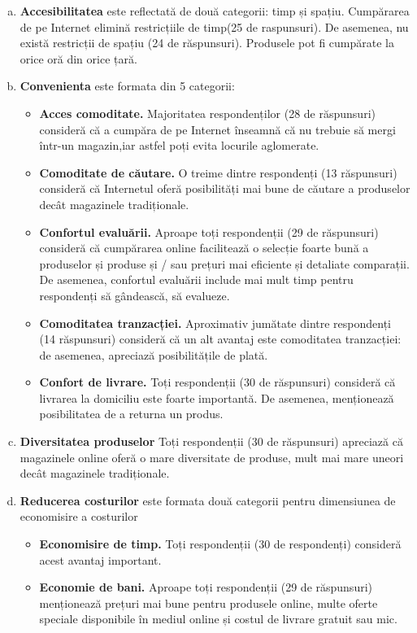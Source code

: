 \documentclass[a4paper, 12pt]{article}
\begin{document}
	\begin{enumerate}[a.]
		
	\item\textbf {Accesibilitatea} este reflectată de două categorii: timp și spațiu. Cumpărarea de pe Internet elimină restricțiile de timp(25 de raspunsuri). De asemenea, nu există restricții de spațiu (24 de răspunsuri). Produsele pot fi cumpărate la orice oră din orice țară.
	\item\textbf{Convenienta} este formata din 5 categorii: 

	\begin{itemize}
		\item\textbf{ Acces comoditate.} Majoritatea respondenților (28 de răspunsuri) consideră că a cumpăra de pe Internet înseamnă că nu trebuie să mergi într-un magazin,iar astfel poți evita locurile aglomerate.
		\item\textbf{Comoditate de căutare.} O treime dintre respondenți (13 răspunsuri) consideră că Internetul oferă posibilități mai bune de căutare a produselor decât magazinele tradiționale.
		\item\textbf{Confortul evaluării.} Aproape toți respondenții (29 de răspunsuri) consideră că cumpărarea online facilitează o selecție foarte bună a produselor și produse și / sau prețuri mai eficiente și detaliate comparații. De asemenea, confortul evaluării include mai mult timp pentru respondenți să gândească, să evalueze.
		\item\textbf{Comoditatea tranzacției.} Aproximativ jumătate dintre respondenți (14 răspunsuri) consideră că un alt avantaj este comoditatea tranzacției: de asemenea, apreciază posibilitățile de plată.
		\item\textbf{Confort de livrare.} Toți respondenții (30 de răspunsuri) consideră că livrarea la domiciliu este foarte importantă. De asemenea, menționează posibilitatea de a returna un produs.
	\end{itemize}
		\item\textbf{Diversitatea produselor} Toți respondenții (30 de răspunsuri) apreciază că magazinele online oferă o mare diversitate de produse, mult mai mare uneori decât magazinele tradiționale.
		\item\textbf{Reducerea costurilor} este formata două categorii pentru dimensiunea de economisire a costurilor
	\begin{itemize}
		\item\textbf{Economisire de timp.} Toți respondenții (30 de respondenți) consideră acest avantaj important.
		\item\textbf{Economie de bani.} Aproape toți respondenții (29 de răspunsuri) menționează prețuri mai bune pentru produsele online, multe oferte speciale disponibile în mediul online și costul de livrare gratuit sau mic.

\end{itemize}
\end{enumerate}
\end{document}
